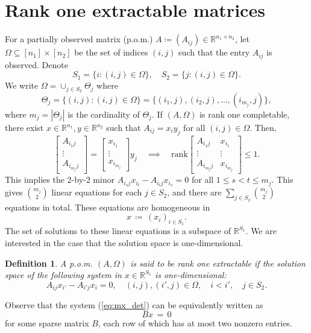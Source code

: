 \documentclass{amsart}
\newcommand{\re}{\mathbb{R}}
\def\rank{\mbox{rank}}
\newcommand{\reff}[1]{(\ref{#1})}
\newcommand{\ddd}{,\ldots,}
\newcommand{\be}{\begin{equation}}
\newcommand{\ee}{\end{equation}}
\newcommand{\bbm}{\begin{bmatrix}}
\newcommand{\ebm}{\end{bmatrix}}
\newtheorem{defi}[theorem]{Definition}
\theoremstyle{definition}
\numberwithin{equation}{section}
\begin{document}
\section{Rank one extractable matrices}\label{sc:ext_mx}



For a partially observed matrix (p.o.m.) $A \coloneqq (A_{ij}) \in \re^{n_1 \times n_2}$,
let $\Omega \subseteq [n_1] \times [n_2]$ be the set of indices $(i,j)$ 
such that the entry $A_{ij}$ is observed.
Denote
\be\label{S1S2}
S_1 = \{ i : (i,j) \in \Omega \}, 
\quad S_2 = \{ j : (i,j) \in \Omega \}.
\ee
We write $\Omega = \cup_{j \in S_2} \Theta_j$ where 
\be\label{theta_j}
\Theta_j = \{ (i,j) : (i,j) \in \Omega \} = \{ (i_1, j), (i_2, j) \ddd (i_{m_j}, j) \},
\ee
where $m_j = |\Theta_j|$ is the cardinality of $\Theta_j$.
If $(A, \Omega)$ is rank one completable, there exist $x \in \re^{n_1}, y \in \re^{n_2}$ 
such that $A_{ij} = x_iy_j$ for all $(i,j) \in \Omega$.
Then,
\[
\bbm A_{i_1 j} \\ 
\vdots \\ 
A_{i_{m_j} j} 
\ebm
= \bbm x_{i_1} \\ 
\vdots \\ 
x_{i_{m_j}} 
\ebm y_j
\quad \implies \quad
\rank 
\bbm 
A_{i_1 j} & x_{i_1} \\ 
\vdots & \vdots \\ 
A_{i_{m_j} j} & x_{i_{m_j}} 
\ebm \le 1.
\]
This implies the 2-by-2 minor
$
A_{i_s j} x_{i_t} - A_{i_t j} x_{i_s} = 0
$
for all $1 \le s < t \le m_j$.
This gives 
$\binom{m_j}{2}$
linear equations for each $j \in S_2$,
and there are
$
\sum_{j \in S_2} \binom{m_j}{2}
$
equations in total.
These equations are homogeneous in 
\[
x \, \coloneqq \, ( x_i )_{i \in S_1}.
\]
The set of solutions to these linear equations is a subspace of $\re^{S_1}$.
We are interested in the case that the solution space is one-dimensional.




\begin{defi}\label{def:rank1_det_mx}
A p.o.m. $(A, \Omega)$ is said to be rank one extractable if the solution space of 
the following system in $x \in \re^{S_1}$ is one-dimensional:
\be\label{eq:mx_det}
A_{i j} x_{i'} - A_{i' j} x_{i} = 0, \quad (i, j), (i', j) \in \Omega, \quad i < i', \quad j \in S_2.
\ee
\end{defi}

Observe that the system \reff{eq:mx_det} can be equivalently written as
\be\label{Bx=0_mx}
Bx \,=\, 0
\ee
for some sparse matrix $B$,
each row of which has at most two nonzero entries.
\end{document}
